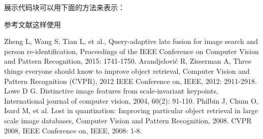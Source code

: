 \documentclass[12pt]{article}
\begin{document}
\clearpage
\songti{}展示代码块可以用下面的方法来表示：


\clearpage
\songti{}参考文献这样使用\cite{ref2}
\begin{thebibliography}{99}  
    Zheng L, Wang S, Tian L, et al., Query-adaptive late fusion for image search and person re-identification, Proceedings of the IEEE Conference on Computer Vision and Pattern Recognition, 2015: 1741-1750.  
    Arandjelović R, Zisserman A, Three things everyone should know to improve object retrieval, Computer Vision and Pattern Recognition (CVPR), 2012 IEEE Conference on, IEEE, 2012: 2911-2918.  
    Lowe D G. Distinctive image features from scale-invariant keypoints, International journal of computer vision, 2004, 60(2): 91-110.  
    Philbin J, Chum O, Isard M, et al. Lost in quantization: Improving particular object retrieval in large scale image databases, Computer Vision and Pattern Recognition, 2008. CVPR 2008, IEEE Conference on, IEEE, 2008: 1-8.  
\end{thebibliography}
\end{document}
